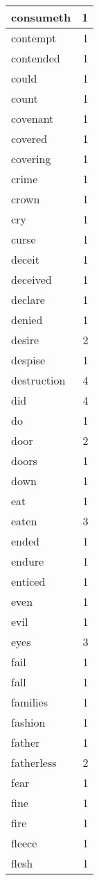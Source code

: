 \begin{center}
\begin{longtable}{l|r}
consumeth & 1 \\ \hline
contempt & 1 \\ \hline
contended & 1 \\ \hline
could & 1 \\ \hline
count & 1 \\ \hline
covenant & 1 \\ \hline
covered & 1 \\ \hline
covering & 1 \\ \hline
crime & 1 \\ \hline
crown & 1 \\ \hline
cry & 1 \\ \hline
curse & 1 \\ \hline
deceit & 1 \\ \hline
deceived & 1 \\ \hline
declare & 1 \\ \hline
denied & 1 \\ \hline
desire & 2 \\ \hline
despise & 1 \\ \hline
destruction & 4 \\ \hline
did & 4 \\ \hline
do & 1 \\ \hline
door & 2 \\ \hline
doors & 1 \\ \hline
down & 1 \\ \hline
eat & 1 \\ \hline
eaten & 3 \\ \hline
ended & 1 \\ \hline
endure & 1 \\ \hline
enticed & 1 \\ \hline
even & 1 \\ \hline
evil & 1 \\ \hline
eyes & 3 \\ \hline
fail & 1 \\ \hline
fall & 1 \\ \hline
families & 1 \\ \hline
fashion & 1 \\ \hline
father & 1 \\ \hline
fatherless & 2 \\ \hline
fear & 1 \\ \hline
fine & 1 \\ \hline
fire & 1 \\ \hline
fleece & 1 \\ \hline
flesh & 1 \\ \hline

\end{longtable}
\end{center}
